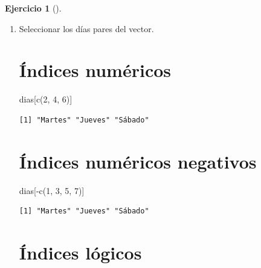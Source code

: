\documentclass[
  a4paper,
]{scrreport}
\newenvironment{Shaded}{\begin{snugshade}}{\end{snugshade}}
\newcommand{\DecValTok}[1]{\textcolor[rgb]{0.68,0.00,0.00}{#1}}
\newcommand{\FunctionTok}[1]{\textcolor[rgb]{0.28,0.35,0.67}{#1}}
\newcommand{\NormalTok}[1]{\textcolor[rgb]{0.00,0.23,0.31}{#1}}
\newcommand{\SpecialCharTok}[1]{\textcolor[rgb]{0.37,0.37,0.37}{#1}}
\theoremstyle{definition}
\newtheorem{exercise}{Ejercicio}[chapter]
\theoremstyle{remark}
\begin{document}
\begin{exercise}[]
\begin{enumerate}
\begin{tcolorbox}
\begin{verbatim}
[1] "Miércoles"
\end{verbatim}

  \end{tcolorbox}
\item
  Seleccionar los días pares del vector.

  \begin{tcolorbox}[enhanced jigsaw, colframe=quarto-callout-tip-color-frame, toprule=.15mm, bottomtitle=1mm, breakable, opacitybacktitle=0.6, toptitle=1mm, colback=white, bottomrule=.15mm, title=\textcolor{quarto-callout-tip-color}{\faLightbulb}\hspace{0.5em}{Solución}, arc=.35mm, left=2mm, titlerule=0mm, rightrule=.15mm, coltitle=black, leftrule=.75mm, opacityback=0, colbacktitle=quarto-callout-tip-color!10!white]

  \section{Índices numéricos}

\begin{Shaded}
\begin{Highlighting}[]
\NormalTok{dias[}\FunctionTok{c}\NormalTok{(}\DecValTok{2}\NormalTok{, }\DecValTok{4}\NormalTok{, }\DecValTok{6}\NormalTok{)]}
\end{Highlighting}
\end{Shaded}

\begin{verbatim}
[1] "Martes" "Jueves" "Sábado"
\end{verbatim}

  \section{Índices numéricos negativos}

\begin{Shaded}
\begin{Highlighting}[]
\NormalTok{dias[}\SpecialCharTok{{-}}\FunctionTok{c}\NormalTok{(}\DecValTok{1}\NormalTok{, }\DecValTok{3}\NormalTok{, }\DecValTok{5}\NormalTok{, }\DecValTok{7}\NormalTok{)]}
\end{Highlighting}
\end{Shaded}

\begin{verbatim}
[1] "Martes" "Jueves" "Sábado"
\end{verbatim}

  \section{Índices lógicos}


\end{tcolorbox}
\end{enumerate}
\end{exercise}
\end{document}
